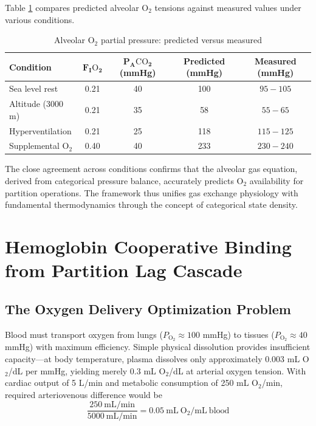\documentclass[12pt,a4paper]{article}
\theoremstyle{remark}
\begin{document}
Table \ref{tab:alveolar_gas_validation} compares predicted alveolar O$_{2}$ tensions against measured values under various conditions.

\begin{table}[h]
\centering
\caption{Alveolar O$_{2}$ partial pressure: predicted versus measured}
\label{tab:alveolar_gas_validation}
\begin{tabular}{lcccc}
\toprule
\textbf{Condition} & $\boldsymbol{F_{I}\mathrm{O}_{2}}$ & $\boldsymbol{P_{A}\mathrm{CO}_{2}}$ (mmHg) & \textbf{Predicted} (mmHg) & \textbf{Measured} (mmHg) \\
\midrule
Sea level rest & 0.21 & 40 & 100 & $95-105$ \\
Altitude (3000 m) & 0.21 & 35 & 58 & $55-65$ \\
Hyperventilation & 0.21 & 25 & 118 & $115-125$ \\
Supplemental O$_{2}$ & 0.40 & 40 & 233 & $230-240$ \\
\bottomrule
\end{tabular}
\end{table}

The close agreement across conditions confirms that the alveolar gas equation, derived from categorical pressure balance, accurately predicts O$_{2}$ availability for partition operations. The framework thus unifies gas exchange physiology with fundamental thermodynamics through the concept of categorical state density.

\section{Hemoglobin Cooperative Binding from Partition Lag Cascade}
\label{sec:hemoglobin}

\subsection{The Oxygen Delivery Optimization Problem}

Blood must transport oxygen from lungs ($P_{\mathrm{O}_{2}} \approx 100$ mmHg) to tissues ($P_{\mathrm{O}_{2}} \approx 40$ mmHg) with maximum efficiency. Simple physical dissolution provides insufficient capacity—at body temperature, plasma dissolves only approximately $0.003$ mL O$_{2}$/dL per mmHg, yielding merely $0.3$ mL O$_{2}$/dL at arterial oxygen tension. With cardiac output of 5 L/min and metabolic consumption of 250 mL O$_{2}$/min, required arteriovenous difference would be
\begin{equation}
\frac{250~\mathrm{mL/min}}{5000~\mathrm{mL/min}} = 0.05~\mathrm{mL~O}_{2}/\mathrm{mL~blood}
\end{equation}
\end{document}
